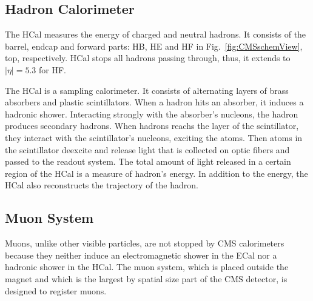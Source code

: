 \subsection{Hadron Calorimeter}
\label{sec:Exp_CMS_HCal}
The HCal measures the energy of charged and neutral hadrons. It consists of the barrel, endcap and forward parts: HB, HE and HF in Fig.~\ref{fig:CMSschemView}, top, respectively. HCal stops all hadrons passing through, thus, it extends to $|\eta|=5.3$ for HF.

The HCal is a sampling calorimeter. It consists of alternating layers of brass absorbers and plastic scintillators. When a hadron hits an absorber, it induces a hadronic shower. Interacting strongly with the absorber's nucleons, the hadron produces secondary hadrons. When hadrons reachs the layer of the scintillator, they interact with the scintillator's nucleons, exciting the atoms. Then atoms in the scintillator deexcite and release light that is collected on optic fibers and passed to the readout system. The total amount of light released in a certain region of the HCal is a measure of hadron's energy. In addition to the energy, the HCal also reconstructs the trajectory of the hadron.   

\subsection{Muon System}

Muons, unlike other visible particles, are not stopped by CMS calorimeters because they neither induce an electromagnetic shower in the ECal nor a hadronic shower in the HCal. The muon system, which is placed outside the magnet and which is the largest by spatial size part of the CMS detector, is designed to register muons.

